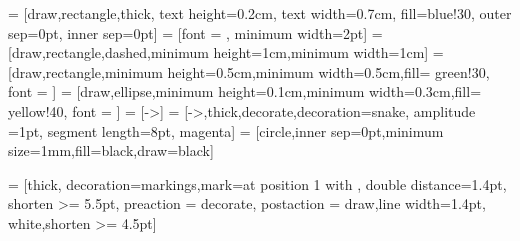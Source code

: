 

 = [draw,rectangle,thick,
text height=0.2cm, text width=0.7cm, 
fill=blue!30, outer sep=0pt, inner sep=0pt]
 = [font = \large, minimum width=2pt]
 = [draw,rectangle,dashed,minimum height=1cm,minimum width=1cm]
 = [draw,rectangle,minimum height=0.5cm,minimum width=0.5cm,fill= green!30, font =  \scriptsize]
 = [draw,ellipse,minimum height=0.1cm,minimum width=0.3cm,fill= yellow!40, font =  \scriptsize ]
 = [->]
 = [->,thick,decorate,decoration={snake, amplitude =1pt, segment length=8pt}, magenta]
 = [circle,inner sep=0pt,minimum size=1mm,fill=black,draw=black]

 = [thick, decoration={markings,mark=at position
   1 with {}},
   double distance=1.4pt, shorten >= 5.5pt,
   preaction = {decorate},
   postaction = {draw,line width=1.4pt, white,shorten >= 4.5pt}]



